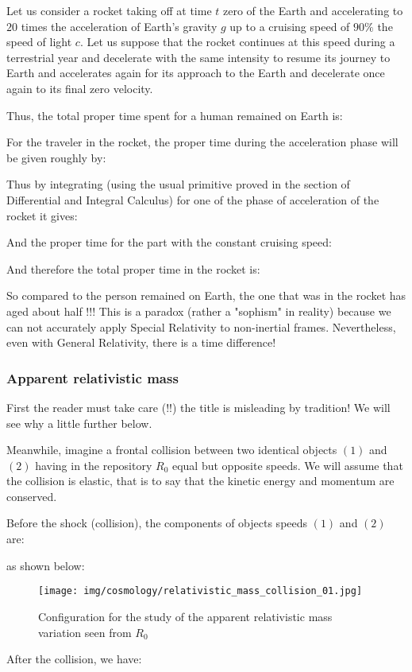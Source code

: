 	Let us consider a rocket taking off at time $t$ zero of the Earth and accelerating to $20$ times the acceleration of Earth's gravity $g$ up to a cruising speed of $90\%$ the speed of light $c$. Let us suppose that the rocket continues at this speed during a terrestrial year and decelerate with the same intensity to resume its journey to Earth and accelerates again for its approach to the Earth and decelerate once again to its final zero velocity.
	
	
	Thus, the total proper time spent for a human remained on Earth is:
	
	For the traveler in the rocket, the proper time during the acceleration phase will be given roughly by:
	
	Thus by integrating (using the usual primitive proved in the section of Differential and Integral Calculus) for one of the phase of acceleration of the rocket it gives:
	
	And the proper time for the part with the constant cruising speed:
	
	And therefore the total proper time in the rocket is:
	
	So compared to the person remained on Earth, the one that was in the rocket has aged about half !!! This is a paradox (rather a "sophism" in reality) because we can not accurately apply Special Relativity to non-inertial frames. Nevertheless, even with General Relativity, there is a time difference!
	
	\subsubsection{Apparent relativistic mass}
	First the reader must take care (!!) the title is misleading by tradition! We will see why a little further below.

	Meanwhile, imagine a frontal collision between two identical objects $(1)$ and $(2)$ having in the repository $R_0$ equal but opposite speeds. We will assume that the collision is elastic, that is to say that the kinetic energy and momentum are conserved.

	Before the shock (collision), the components of objects speeds $(1)$ and $(2)$ are:
	
	as shown below:
	\begin{figure}[H]
		\begin{center}
		\texttt{[image: img/cosmology/relativistic\_mass\_collision\_01.jpg]}
		\caption{Configuration for the study of the apparent relativistic mass variation seen from $R_0$}
		\end{center}
	\end{figure}
	After the collision, we have:
	
